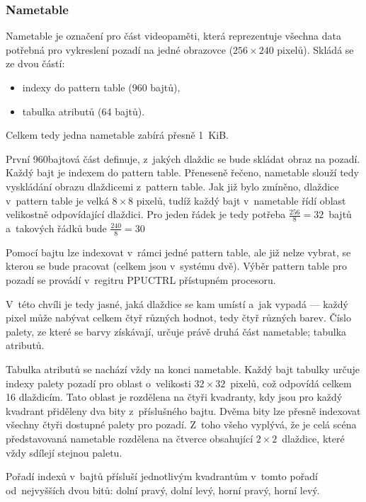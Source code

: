 \subsubsection{Nametable}
Nametable je označení pro část videopaměti, která reprezentuje všechna data potřebná pro vykreslení pozadí na jedné obrazovce ($256 \times 240$ pixelů). Skládá se ze dvou částí:

\begin{itemize}
	\item indexy do pattern table (960 bajtů),
	\item tabulka atributů (64 bajtů).
\end{itemize}

Celkem tedy jedna nametable zabírá přesně 1~KiB.

První 960bajtová část definuje, z~jakých dlaždic se bude skládat obraz na pozadí. Každý bajt je indexem do pattern table. Přeneseně řečeno, nametable slouží tedy vyskládání obrazu dlaždicemi z~pattern table. Jak již bylo zmíněno, dlaždice v~pattern table je velká $8 \times 8$ pixelů, tudíž každý bajt v~nametable řídí oblast velikostně odpovídající dlaždici. Pro jeden řádek je tedy potřeba $\frac{256}{8} = 32$~bajtů a~takových řádků bude $\frac{240}{8} = 30$

\begin{note}
	Pomocí bajtu lze indexovat v~rámci jedné pattern table, ale již nelze vybrat, se kterou se bude pracovat (celkem jsou v~systému dvě). Výběr pattern table pro pozadí se provádí v~regitru PPUCTRL přístupném procesoru.
\end{note}

V~této chvíli je tedy jasné, jaká dlaždice se kam umístí a~jak vypadá --- každý pixel může nabývat celkem čtyř různých hodnot, tedy čtyř různých barev. Číslo palety, ze které se barvy získávají, určuje právě druhá část nametable; tabulka atributů.

Tabulka atributů se nachází vždy na konci nametable. Každý bajt tabulky určuje indexy palety pozadí pro oblast o~velikosti $32 \times 32$~pixelů, což odpovídá celkem 16 dlaždicím. Tato oblast je rozdělena na čtyři kvadranty, kdy jsou pro každý kvadrant přiděleny dva bity z~příslušného bajtu. Dvěma bity lze přesně indexovat všechny čtyři dostupné palety pro pozadí. Z~toho všeho vyplývá, že je celá scéna představovaná nametable rozdělena na čtverce obsahující $2\times2$~dlaždice, které vždy sdílejí stejnou paletu.

Pořadí indexů v~bajtů přísluší jednotlivým kvadrantům v~tomto pořadí od~nejvyšších dvou bitů: dolní pravý, dolní levý, horní pravý, horní levý.


